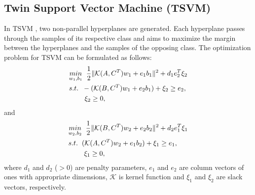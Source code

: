 \subsection{Twin Support Vector Machine (TSVM)}
In TSVM \cite{khemchandani2007twin}, two non-parallel hyperplanes are generated. Each hyperplane passes through the samples of its respective class and aims to maximize the margin between the hyperplanes and the samples of the opposing class. The optimization problem for TSVM can be formulated as follows:
\begin{align}
\label{eq:1}
      & \underset{w_1,b_1}{min} \hspace{0.2cm} \frac{1}{2} \|\mathcal{K}(A, C^T)w_1 + e_1b_1\|^2 + d_1e_2^T\xi_2 \nonumber \\
     & s.t. \hspace{0.2cm} -(\mathcal{K}(B, C^T)w_1 + e_2b_1) + \xi_2 \geq e_2, \nonumber \\
     & \hspace{0.8cm} \xi_2 \geq 0,
\end{align}
and
\begin{align}
\label{eq:2}
    & \underset{w_2,b_2}{min} \hspace{0.2cm} \frac{1}{2} \|\mathcal{K}(B, C^T)w_2 + e_2b_2\|^2 + d_2e_1^T\xi_1 \nonumber \\
     & s.t. \hspace{0.2cm} (\mathcal{K}(A, C^T)w_2 + e_1b_2) + \xi_1 \geq e_1, \nonumber \\
     & \hspace{0.8cm} \xi_1 \geq 0,
\end{align}
where \( d_1 \) and \( d_2 \) (\( > 0 \)) are penalty parameters, \( e_1 \) and \( e_2 \) are column vectors of ones with appropriate dimensions, $\mathcal{K}$ is kernel function and \( \xi_1 \) and \( \xi_2 \) are slack vectors, respectively. 

